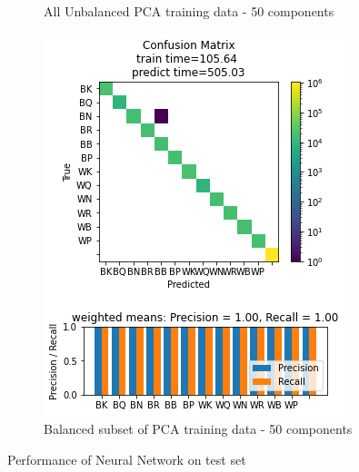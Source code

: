 \documentclass{article}
\newcommand{\FIGLABEL}[1]{Performance of #1 on test set}
\newcommand{\PCAFL}{All Unbalanced PCA training data - 50 components}
\newcommand{\PCABL}{Balanced subset of PCA training data - 50 components}
\begin{document}
\begin{figure}[h]
\begin{subfigure}{0.33\textwidth}
\caption{\PCAFL}
\end{subfigure}
\begin{subfigure}{0.33\textwidth}
\includegraphics[width=0.9\linewidth]{NN_B_PCA50c_160x160_evaluation.png} 
\caption{\PCABL}
\end{subfigure}
\caption{\FIGLABEL{Neural Network}}
\label{fig:NN}
\end{figure}
\end{document}
